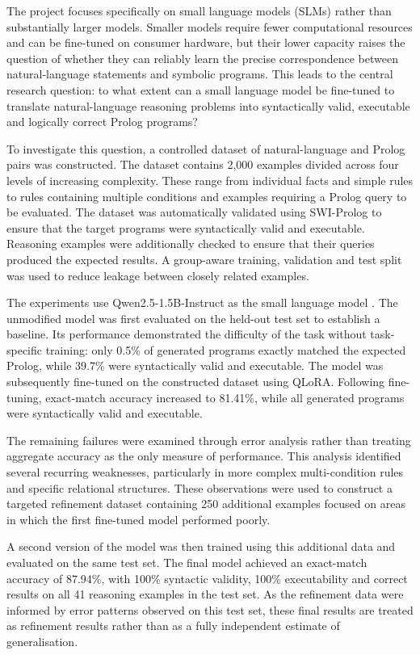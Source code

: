 \documentclass[11pt]{article} %
\theoremstyle{plain}
\theoremstyle{definition}
\begin{document}
The project focuses specifically on small language models (SLMs) rather than
substantially larger models. Smaller models require fewer computational
resources and can be fine-tuned on consumer hardware, but their lower capacity
raises the question of whether they can reliably learn the precise
correspondence between natural-language statements and symbolic programs. This
leads to the central research question: to what extent can a small language
model be fine-tuned to translate natural-language reasoning problems into
syntactically valid, executable and logically correct Prolog programs?

To investigate this question, a controlled dataset of natural-language and
Prolog pairs was constructed. The dataset contains 2,000 examples divided
across four levels of increasing complexity. These range from individual facts
and simple rules to rules containing multiple conditions and examples requiring
a Prolog query to be evaluated. The dataset was automatically validated using
SWI-Prolog to ensure that the target programs were syntactically valid and
executable. Reasoning examples were additionally checked to ensure that their
queries produced the expected results. A group-aware training, validation and
test split was used to reduce leakage between closely related examples.

The experiments use Qwen2.5-1.5B-Instruct as the small language model \cite{qwen25}. The
unmodified model was first evaluated on the held-out test set to establish a
baseline. Its performance demonstrated the difficulty of the task without
task-specific training: only 0.5\% of generated programs exactly matched the
expected Prolog, while 39.7\% were syntactically valid and executable. The model
was subsequently fine-tuned on the constructed dataset using QLoRA. Following
fine-tuning, exact-match accuracy increased to 81.41\%, while all generated
programs were syntactically valid and executable.

The remaining failures were examined through error analysis rather than
treating aggregate accuracy as the only measure of performance. This analysis
identified several recurring weaknesses, particularly in more complex
multi-condition rules and specific relational structures. These observations
were used to construct a targeted refinement dataset containing 250 additional
examples focused on areas in which the first fine-tuned model performed poorly.

A second version of the model was then trained using this additional data and
evaluated on the same test set. The final model achieved an exact-match accuracy
of 87.94\%, with 100\% syntactic validity, 100\% executability and correct results on
all 41 reasoning examples in the test set. As the refinement data were informed by
error patterns observed on this test set, these final results are treated as refinement
results rather than as a fully independent estimate of generalisation.
\end{document}
